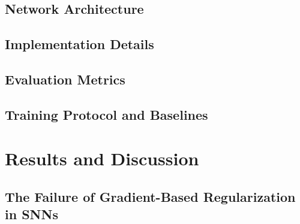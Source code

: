 \documentclass[5p,times]{elsarticle}
\begin{document}
\subsection{Network Architecture}

\subsection{Implementation Details}

\subsection{Evaluation Metrics}

\subsection{Training Protocol and Baselines}


\section{Results and Discussion}

\subsection{The Failure of Gradient-Based Regularization in SNNs}
\end{document}
